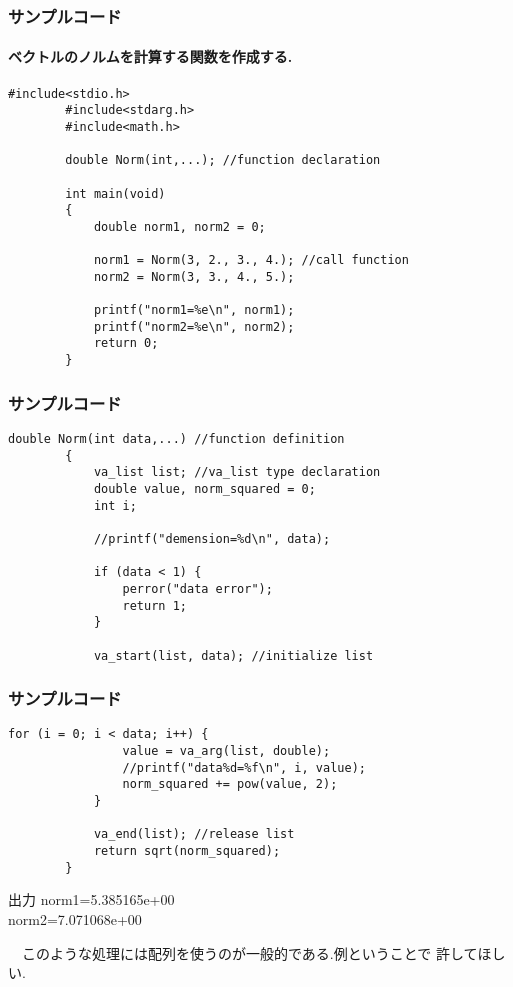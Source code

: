 \documentclass[dvipdfmx]{beamer}
\begin{document}
\begin{frame}[t, fragile, label=48]
    \frametitle{サンプルコード}
    \framesubtitle{ベクトルのノルムを計算する関数を作成する.}
    \vspace{-10pt}
    \begin{lstlisting}[gobble=8, caption=pra\_func.c]
        #include<stdio.h>
        #include<stdarg.h>
        #include<math.h>

        double Norm(int,...); //function declaration

        int main(void)
        {
            double norm1, norm2 = 0;

            norm1 = Norm(3, 2., 3., 4.); //call function
            norm2 = Norm(3, 3., 4., 5.);

            printf("norm1=%e\n", norm1);
            printf("norm2=%e\n", norm2);
            return 0;
        }
    \end{lstlisting}
    \vfill \hfill 
    \hyperlink{47}{}
    \space
    \hyperlink{49}{}
\end{frame}

\begin{frame}[t, fragile, label=49]
    \frametitle{サンプルコード}
    \begin{lstlisting}[gobble=8, firstnumber=18, caption=pra\_func.c]
        double Norm(int data,...) //function definition
        {
            va_list list; //va_list type declaration
            double value, norm_squared = 0;
            int i;

            //printf("demension=%d\n", data);

            if (data < 1) {
                perror("data error");
                return 1;
            }

            va_start(list, data); //initialize list

    \end{lstlisting}
    \vfill \hfill 
    \hyperlink{48}{}
    \space
    \hyperlink{50}{}
\end{frame}

\begin{frame}[t, fragile, label=50]
    \frametitle{サンプルコード}
    \begin{lstlisting}[gobble=8, firstnumber=32, caption=pra\_func.c]
            for (i = 0; i < data; i++) {
                value = va_arg(list, double);
                //printf("data%d=%f\n", i, value);
                norm_squared += pow(value, 2);
            }
            
            va_end(list); //release list
            return sqrt(norm_squared);
        }
    \end{lstlisting}
    \begin{block}{出力}
        norm1=5.385165e+00\\
        norm2=7.071068e+00
    \end{block}
    　このような処理には配列を使うのが一般的である.例ということで
    許してほしい.
    \vfill \hfill 
    \hyperlink{49}{}
    \space
    \hyperlink{51}{}
\end{frame}
\end{document}
